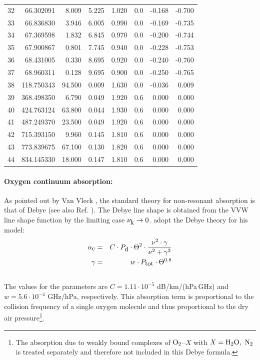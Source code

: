\begin{longtable}{lrrrrrrr}
32 & 66.302091 &   8.009 &  5.225 &    1.020 & 0.0 &  -0.168 &   -0.700\\
33 & 66.836830 &   3.946 &  6.005 &    0.990 & 0.0 &  -0.169 &   -0.735\\
34 & 67.369598 &   1.832 &  6.845 &    0.970 & 0.0 &  -0.200 &   -0.744\\
35 & 67.900867 &   0.801 &  7.745 &    0.940 & 0.0 &  -0.228 &   -0.753\\
36 & 68.431005 &   0.330 &  8.695 &    0.920 & 0.0 &  -0.240 &   -0.760\\
37 & 68.960311 &   0.128 &  9.695 &    0.900 & 0.0 &  -0.250 &   -0.765\\
38 & 118.750343 &  94.500 &  0.009 &   1.630 & 0.0 &  -0.036 &    0.009\\
39 & 368.498350 &   6.790 &  0.049 &   1.920 & 0.6 &   0.000 &    0.000\\
40 & 424.763124 &  63.800 &  0.044 &   1.930 & 0.6 &   0.000 &    0.000\\
41 & 487.249370 &  23.500 &  0.049 &   1.920 & 0.6 &   0.000 &    0.000\\
42 & 715.393150 &   9.960 &  0.145 &   1.810 & 0.6 &   0.000 &    0.000\\
43 & 773.839675 &  67.100 &  0.130 &   1.820 & 0.6 &   0.000 &    0.000\\
44 & 834.145330 &  18.000 &  0.147 &   1.810 & 0.6 &   0.000 &    0.000\\
\end{longtable}

\paragraph{Oxygen continuum absorption:}
\label{levele:mpm93_o2cont}
As pointed out by Van Vleck \citep{vv:87}, the standard theory for
non-resonant absorption is that of Debye (see also Ref. \citet{townes:55}). 
The Debye line shape is obtained from the VVW line shape function 
by the limiting case $\nu_{\mbox{\rm \small k}} \rightarrow 0$.
\citet{liebeetal:93} adopt the Debye theory for his model:
\begin{eqnarray}
  \label{eq:abs_theory:mpm93_o2cont}
  \alphac &=&  C \cdot \pda \cdot \Theta^2 \cdot 
               \frac{\nu^2 \cdot \gamma}{\nu^2+\gamma^2}\\
%
  \label{eq:abs_theory:mpm93_o2cont_1}
  \gamma  &=&  w \cdot \ptot \cdot \Theta^{0.8}\nonumber\\
\nonumber
\end{eqnarray}
The values for the parameters are $C = 1.11\cdot 10^{-5}$ dB/km/(hPa\,GHz) and 
$w = 5.6 \cdot 10^{-4}$ GHz/hPa, respectively. This absorption
term is proportional to the collision frequency of a single oxygen molecule
and thus proportional to the dry air pressure\footnote{The absorption
  due to weakly bound complexes of $\mbox{O}_2$--$X$ with $X=\mbox{H}_2\mbox{O},~\mbox{N}_2$ is 
  treated separately and therefore not included in this Debye
  formula.}.




